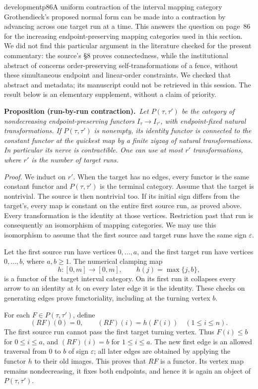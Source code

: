 \begin{dcomment}{development}{p86}{A uniform contraction of the interval mapping category}
Grothendieck's proposed normal form can be made into a contraction by advancing across one target run at a time. This answers the question on page~86 for the increasing endpoint-preserving mapping categories used in this section. We did not find this particular argument in the literature checked for the present commentary: the source's \S8 proves connectedness, while the institutional abstract of \citet{FernandesKoppitzMusunthia2019} concerns order-preserving self-transformations of a fence, without these simultaneous endpoint and linear-order constraints. We checked that abstract and metadata; its manuscript could not be retrieved in this session. The result below is an elementary supplement, without a claim of priority.

\textbf{Proposition (run-by-run contraction).}\ours\
\textit{Let $P(\tau,\tau')$ be the category of nondecreasing endpoint-preserving functors $I_\tau\to I_{\tau'}$, with endpoint-fixed natural transformations. If $P(\tau,\tau')$ is nonempty, its identity functor is connected to the constant functor at the quickest map by a finite zigzag of natural transformations. In particular its nerve is contractible. One can use at most $r'$ transformations, where $r'$ is the number of target runs.}

\textit{Proof.} We induct on $r'$. When the target has no edges, every functor is the same constant functor and $P(\tau,\tau')$ is the terminal category. Assume that the target is nontrivial. The source is then nontrivial too. If its initial sign differs from the target's, every map is constant on the entire first source run, as proved above. Every transformation is the identity at those vertices. Restriction past that run is consequently an isomorphism of mapping categories. We may use this isomorphism to assume that the first source and target runs have the same sign $\varepsilon$.

Let the first source run have vertices $0,\ldots,a$, and the first target run have vertices $0,\ldots,b$, where $a,b\geq1$. The numerical clamping map
\[
 h:[0,m]\longrightarrow[0,m],\qquad h(j)=\max\{j,b\},
\]
is a functor of the target interval category. On its first run it collapses every arrow to an identity at $b$; on every later edge it is the identity. These checks on generating edges prove functoriality, including at the turning vertex $b$.

For each $F\in P(\tau,\tau')$, define
\[
 (RF)(0)=0,\qquad (RF)(i)=h(F(i))\quad(1\leq i\leq n).
\]
The first source run cannot pass the first target turning vertex. Thus $F(i)\leq b$ for $0\leq i\leq a$, and $(RF)(i)=b$ for $1\leq i\leq a$. The new first edge is an allowed traversal from $0$ to $b$ of sign $\varepsilon$; all later edges are obtained by applying the functor $h$ to their old images. This proves that $RF$ is a functor. Its vertex map remains nondecreasing, it fixes both endpoints, and hence it is again an object of $P(\tau,\tau')$.


\end{dcomment}
